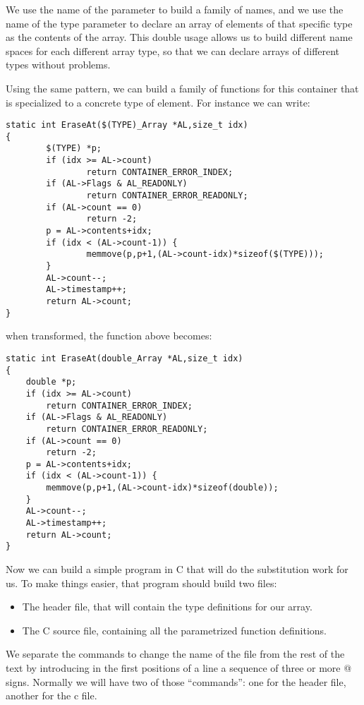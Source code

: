 \documentclass[12pt,a4paper]{memoir} %
\begin{document}
{{We use the name of the parameter to build a family of names, and we use the name of the type parameter to declare an array of elements of that specific type as the contents of the array. This double usage allows us to build different name spaces for each different array type, so that we can declare arrays of different types without problems.

Using the same pattern, we can build a family of functions for this container that is specialized to a concrete type of element. For instance we can write:

\begin{verbatim}
static int EraseAt($(TYPE)_Array *AL,size_t idx)
{
        $(TYPE) *p;
        if (idx >= AL->count)
                return CONTAINER_ERROR_INDEX;
        if (AL->Flags & AL_READONLY)
                return CONTAINER_ERROR_READONLY;
        if (AL->count == 0)
                return -2;
        p = AL->contents+idx;
        if (idx < (AL->count-1)) {
                memmove(p,p+1,(AL->count-idx)*sizeof($(TYPE)));
        }
        AL->count--;
        AL->timestamp++;
        return AL->count;
}
\end{verbatim}

when transformed, the function above becomes:

\begin{verbatim}
static int EraseAt(double_Array *AL,size_t idx)
{
    double *p;
    if (idx >= AL->count)
        return CONTAINER_ERROR_INDEX;
    if (AL->Flags & AL_READONLY)
        return CONTAINER_ERROR_READONLY;
    if (AL->count == 0)
        return -2;
    p = AL->contents+idx;
    if (idx < (AL->count-1)) {
        memmove(p,p+1,(AL->count-idx)*sizeof(double));
    }
    AL->count--;
    AL->timestamp++;
    return AL->count;
}
\end{verbatim}

Now we can build a simple program in C that will do the substitution work for us. To make things easier, that program should build two files:
\begin{itemize}
\item The header file, that will contain the type definitions for our array.
\item The C source file, containing all the parametrized function definitions.
\end{itemize}
We separate the commands to change the name of the file from the rest of the text by introducing in the first positions of a line a sequence of three or more @ signs.  Normally we will have two of those “commands”: one for the header file, another for the c file.

}}
\end{document}
